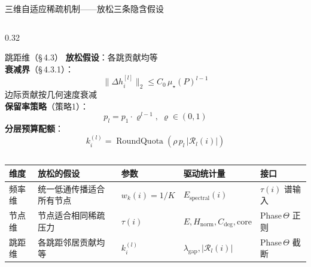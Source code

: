 \documentclass[aspectratio=169,9pt,xcolor=dvipsnames]{beamer}
\newcommand{\green}[1]{\textcolor{mygreen}{#1}}
\begin{document}
\begin{frame}{三维自适应稀疏机制——放松三条隐含假设}
\begin{columns}[T]
\begin{column}{0.32\textwidth}
  \begin{exampleblock}{\green{跳距维（§\,4.3）}}
    \small
    \textbf{放松假设}：各跳贡献均等\\[4pt]
    \textbf{衰减界}（§\,4.3.1）：
    \begin{equation*}
      \|\Delta h_i^{[l]}\|_2\le C_0\,\mu_\star(P)^{l-1}
    \end{equation*}
    边际贡献按几何速度衰减\\[4pt]
    \textbf{保留率策略}（策略1）：
    \begin{equation*}
      p_l=p_1\cdot\varrho^{l-1},\;\varrho\in(0,1)
    \end{equation*}
    \textbf{分层预算配额}：
    \begin{equation*}
      k_i^{(l)}=\operatorname{RoundQuota}(\rho\,p_l\,|\mathcal{R}_l(i)|)
    \end{equation*}
  \end{exampleblock}
\end{column}

\end{columns}

\vspace{0.05cm}
\centering
\begin{tabular}{m{1.4cm}m{3cm}m{1.8cm}m{2.8cm}m{2cm}}
  \toprule
  \textbf{维度} & \textbf{放松的假设} & \textbf{参数} & \textbf{驱动统计量} & \textbf{接口} \\
  \midrule
  频率维 & 统一低通传播适合所有节点 & $w_k(i)=1/K$ & $E_{\mathrm{spectral}}(i)$ & $\tau(i)$ 谱输入 \\
  节点维 & 节点适合相同稀疏压力 & $\tau(i)$ & $E,H_{\mathrm{norm}},C_{\mathrm{deg}},\mathrm{core}$ & Phase\,$\Theta$ 正则 \\
  跳距维 & 各跳距邻居贡献均等 & $k_i^{(l)}$ & $\lambda_{\mathrm{gap}},|\mathcal{R}_l(i)|$ & Phase\,$\Theta$ 截断 \\
  \bottomrule
\end{tabular}
\end{frame}
\end{document}
